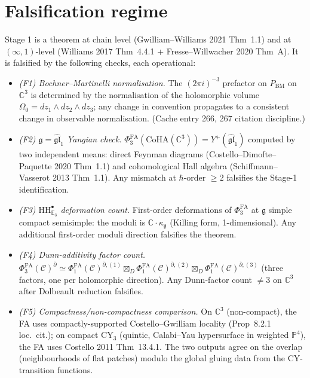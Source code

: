 \documentclass[11pt]{article}
\theoremstyle{definition}
\providecommand{\CC}{\mathbb{C}}
\providecommand{\PP}{\mathbb{P}}
\providecommand{\HH}{\mathrm{HH}}
\providecommand{\fg}{\mathfrak{g}}
\providecommand{\hbarb}{\hbar}
\providecommand{\cC}{\mathcal{C}}
\providecommand{\BM}{\mathrm{BM}}
\providecommand{\FA}{\mathrm{FA}}
\providecommand{\CoHA}{\mathrm{CoHA}}
\begin{document}
\section*{Falsification regime}

Stage 1 is a theorem at chain level (Gwilliam--Williams 2021 Thm~1.1)
and at $(\infty,1)$-level (Williams 2017 Thm~4.4.1 + Fresse--Willwacher
2020 Thm~A). It is falsified by the following checks, each
operational:
\begin{itemize}[leftmargin=2em]
  \item \emph{(F1) Bochner--Martinelli normalisation.} The
        $(2\pi i)^{-3}$ prefactor on $P_{\BM}$ on $\CC^3$ is
        determined by the normalisation of the holomorphic volume
        $\Omega_0 = dz_1\wedge dz_2\wedge dz_3$; any change in
        convention propagates to a consistent change in observable
        normalisation. (Cache entry 266, 267 citation discipline.)
  \item \emph{(F2) $\fg = \widehat{\mathfrak{gl}}_1$ Yangian check.}
        $\Phi^{\FA}_3(\CoHA(\CC^3)) = Y^+(\widehat{\mathfrak{gl}}_1)$
        computed by two independent means: direct Feynman diagrams
        (Costello--Dimofte--Paquette 2020 Thm~1.1) and cohomological
        Hall algebra (Schiffmann--Vasserot 2013 Thm~1.1). Any
        mismatch at $\hbarb$-order $\geq 2$ falsifies the Stage-1
        identification.
  \item \emph{(F3) $\HH^\bullet_{\mathbb{E}_3}$ deformation count.}
        First-order deformations of $\Phi^{\FA}_3$ at $\fg$ simple
        compact semisimple: the moduli is $\CC\cdot\kappa_\fg$
        (Killing form, 1-dimensional). Any additional first-order
        moduli direction falsifies the theorem.
  \item \emph{(F4) Dunn-additivity factor count.}
        $\Phi^{\FA}_3(\cC)^{\bar\partial} \simeq
        \Phi^{\FA}_1(\cC)^{\bar\partial, (1)}
        \boxtimes_D \Phi^{\FA}_1(\cC)^{\bar\partial, (2)}
        \boxtimes_D \Phi^{\FA}_1(\cC)^{\bar\partial, (3)}$ (three
        factors, one per holomorphic direction). Any Dunn-factor
        count $\neq 3$ on $\CC^3$ after Dolbeault reduction falsifies.
  \item \emph{(F5) Compactness/non-compactness comparison.} On
        $\CC^3$ (non-compact), the FA uses compactly-supported
        Costello--Gwilliam locality (Prop~8.2.1 loc.~cit.); on
        compact CY$_3$ (quintic, Calabi--Yau hypersurface in weighted
        $\PP^4$), the FA uses Costello 2011 Thm~13.4.1. The two
        outputs agree on the overlap (neighbourhoods of flat patches)
        modulo the global gluing data from the CY-transition
        functions.
\end{itemize}
\end{document}
